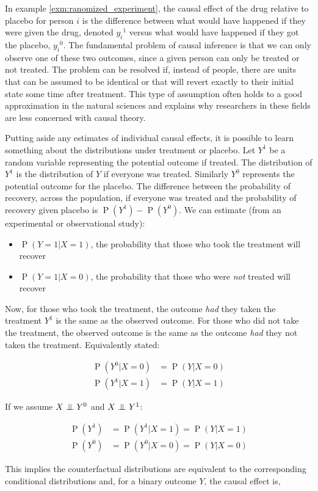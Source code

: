 \documentclass[11pt,a4paper,oneside]{book}
\newcommand{\eq}[1]{\begin{align*}#1\end{align*}}
\renewcommand{\P}[1]{\operatorname{P}\left(#1\right)}
\newcommand{\cf}[2]{{#1}^{#2}}
\theoremstyle{plain}
\theoremstyle{definition}
\newcommand{\ci}{\mathrel{\perp\mspace{-10mu}\perp}}
\begin{document}
In example \ref{exm:ranomized_experiment}, the causal effect of the drug relative to placebo for person $i$ is the difference between what would have happened if they were given the drug, denoted $\cf{y_{i}}{1}$ versus what would have happened if they got the placebo, $\cf{y_{i}}{0}$. The fundamental problem of causal inference is that we can only observe one of these two outcomes, since a given person can only be treated or not treated. The problem can be resolved if, instead of people, there are units that can be assumed to be identical or that will revert exactly to their initial state some time after treatment. This type of assumption often holds to a good approximation in the natural sciences and explains why researchers in these fields are less concerned with causal theory. 

Putting aside any estimates of individual causal effects, it is possible to learn something about the distributions under treatment or placebo. Let $\cf{Y}{1}$ be a random variable representing the potential outcome if treated. The distribution of $\cf{Y}{1}$ is the distribution of $Y$ if everyone was treated. Similarly $Y^{0}$ represents the potential outcome for the placebo. The difference between the probability of recovery, across the population, if everyone was treated and the probability of recovery given placebo is $\P{\cf{Y}{1}}-\P{\cf{Y}{0}}$. We can estimate (from an experimental or observational study):
\begin{itemize}
\item $\P{Y=1|X=1}$, the probability that those who took the treatment will recover
\item $\P{Y=1|X=0}$, the probability that those who were \emph{not} treated will recover
\end{itemize}

Now, for those who took the treatment, the outcome \emph{had} they taken the treatment $\cf{Y}{1}$ is the same as the observed outcome. For those who did not take the treatment, the observed outcome is the same as the outcome \emph{had} they not taken the treatment. Equivalently stated:

\eq{
\P{Y^{0}|X=0}&= \P{Y|X=0}\\
\P{Y^{1}|X=1}&=\P{Y|X=1}
}

If we assume $X \ci Y^{0}$ and $X \ci Y^{1}$:

\eq{
\P{Y^{1}} &= \P{Y^{1}|X=1} = \P{Y|X=1} \\
\P{Y^{0}} &= \P{Y^{0}|X=0} = \P{Y|X=0}
}

This implies the counterfactual distributions are equivalent to the corresponding conditional distributions and, for a binary outcome $Y$, the causal effect is,
\end{document}
